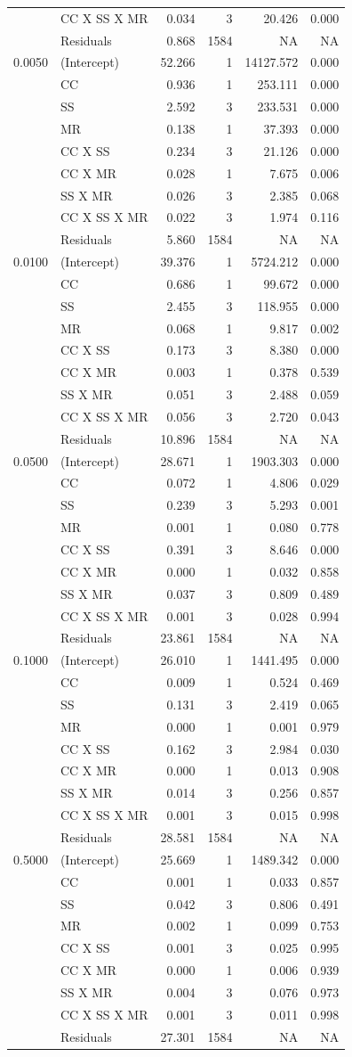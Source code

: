 \documentclass[double,11pt]{beavtex}
\begin{document}
\begin{longtable}[]{@{}llrrrr@{}}
  & CC X SS X MR & 0.034 & 3 & 20.426 & 0.000\tabularnewline
  & Residuals & 0.868 & 1584 & NA & NA\tabularnewline
  0.0050 & (Intercept) & 52.266 & 1 & 14127.572 & 0.000\tabularnewline
  & CC & 0.936 & 1 & 253.111 & 0.000\tabularnewline
  & SS & 2.592 & 3 & 233.531 & 0.000\tabularnewline
  & MR & 0.138 & 1 & 37.393 & 0.000\tabularnewline
  & CC X SS & 0.234 & 3 & 21.126 & 0.000\tabularnewline
  & CC X MR & 0.028 & 1 & 7.675 & 0.006\tabularnewline
  & SS X MR & 0.026 & 3 & 2.385 & 0.068\tabularnewline
  & CC X SS X MR & 0.022 & 3 & 1.974 & 0.116\tabularnewline
  & Residuals & 5.860 & 1584 & NA & NA\tabularnewline
  0.0100 & (Intercept) & 39.376 & 1 & 5724.212 & 0.000\tabularnewline
  & CC & 0.686 & 1 & 99.672 & 0.000\tabularnewline
  & SS & 2.455 & 3 & 118.955 & 0.000\tabularnewline
  & MR & 0.068 & 1 & 9.817 & 0.002\tabularnewline
  & CC X SS & 0.173 & 3 & 8.380 & 0.000\tabularnewline
  & CC X MR & 0.003 & 1 & 0.378 & 0.539\tabularnewline
  & SS X MR & 0.051 & 3 & 2.488 & 0.059\tabularnewline
  & CC X SS X MR & 0.056 & 3 & 2.720 & 0.043\tabularnewline
  & Residuals & 10.896 & 1584 & NA & NA\tabularnewline
  0.0500 & (Intercept) & 28.671 & 1 & 1903.303 & 0.000\tabularnewline
  & CC & 0.072 & 1 & 4.806 & 0.029\tabularnewline
  & SS & 0.239 & 3 & 5.293 & 0.001\tabularnewline
  & MR & 0.001 & 1 & 0.080 & 0.778\tabularnewline
  & CC X SS & 0.391 & 3 & 8.646 & 0.000\tabularnewline
  & CC X MR & 0.000 & 1 & 0.032 & 0.858\tabularnewline
  & SS X MR & 0.037 & 3 & 0.809 & 0.489\tabularnewline
  & CC X SS X MR & 0.001 & 3 & 0.028 & 0.994\tabularnewline
  & Residuals & 23.861 & 1584 & NA & NA\tabularnewline
  0.1000 & (Intercept) & 26.010 & 1 & 1441.495 & 0.000\tabularnewline
  & CC & 0.009 & 1 & 0.524 & 0.469\tabularnewline
  & SS & 0.131 & 3 & 2.419 & 0.065\tabularnewline
  & MR & 0.000 & 1 & 0.001 & 0.979\tabularnewline
  & CC X SS & 0.162 & 3 & 2.984 & 0.030\tabularnewline
  & CC X MR & 0.000 & 1 & 0.013 & 0.908\tabularnewline
  & SS X MR & 0.014 & 3 & 0.256 & 0.857\tabularnewline
  & CC X SS X MR & 0.001 & 3 & 0.015 & 0.998\tabularnewline
  & Residuals & 28.581 & 1584 & NA & NA\tabularnewline
  0.5000 & (Intercept) & 25.669 & 1 & 1489.342 & 0.000\tabularnewline
  & CC & 0.001 & 1 & 0.033 & 0.857\tabularnewline
  & SS & 0.042 & 3 & 0.806 & 0.491\tabularnewline
  & MR & 0.002 & 1 & 0.099 & 0.753\tabularnewline
  & CC X SS & 0.001 & 3 & 0.025 & 0.995\tabularnewline
  & CC X MR & 0.000 & 1 & 0.006 & 0.939\tabularnewline
  & SS X MR & 0.004 & 3 & 0.076 & 0.973\tabularnewline
  & CC X SS X MR & 0.001 & 3 & 0.011 & 0.998\tabularnewline
  & Residuals & 27.301 & 1584 & NA & NA\tabularnewline
  \bottomrule
  \end{longtable}
  
\end{document}
